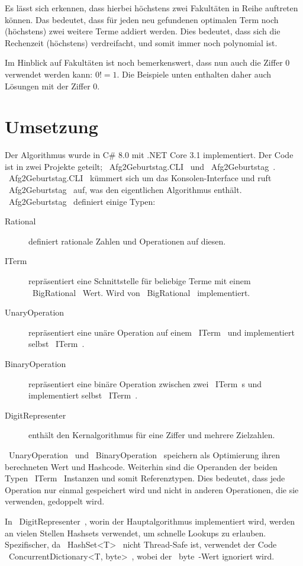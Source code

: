 \documentclass{article}
\theoremstyle{nonumberplain}
\begin{document}
Es lässt sich erkennen, dass hierbei höchstens zwei Fakultäten in Reihe auftreten können.
Das bedeutet, dass für jeden neu gefundenen optimalen Term noch (höchstens) zwei weitere Terme addiert werden.
Dies bedeutet, dass sich die Rechenzeit (höchstens) verdreifacht, und somit immer noch polynomial ist.

Im Hinblick auf Fakultäten ist noch bemerkenswert, dass nun auch die Ziffer \(0\) verwendet werden kann:
\(0! = 1\).
Die Beispiele unten enthalten daher auch Lösungen mit der Ziffer \(0\).

\section{Umsetzung}

Der Algorithmus wurde in C\# 8.0 mit .NET Core 3.1 implementiert.
Der Code ist in zwei Projekte geteilt;
~Afg2Geburtstag.CLI~ und ~Afg2Geburtstag~.
~Afg2Geburtstag.CLI~ kümmert sich um das Konsolen-Interface und ruft ~Afg2Geburtstag~ auf, was den eigentlichen Algorithmus enthält.
~Afg2Geburtstag~ definiert einige Typen:

\begin{description}
    \item[Rational] definiert rationale Zahlen und Operationen auf diesen.
    \item[ITerm] repräsentiert eine Schnittstelle für beliebige Terme mit einem ~BigRational~ Wert. Wird von ~BigRational~ implementiert.
    \item[UnaryOperation] repräsentiert eine unäre Operation auf einem ~ITerm~ und implementiert selbst ~ITerm~.
    \item[BinaryOperation] repräsentiert eine binäre Operation zwischen zwei ~ITerm~s und implementiert selbst ~ITerm~.
    \item[DigitRepresenter] enthält den Kernalgorithmus für eine Ziffer und mehrere Zielzahlen.
\end{description}

~UnaryOperation~ und ~BinaryOperation~ speichern als Optimierung ihren berechneten Wert und Hashcode.
Weiterhin sind die Operanden der beiden Typen ~ITerm~ Instanzen und somit Referenztypen.
Dies bedeutet, dass jede Operation nur einmal gespeichert wird und nicht in anderen Operationen, die sie verwenden, gedoppelt wird.

In ~DigitRepresenter~, worin der Hauptalgorithmus implementiert wird, werden an vielen Stellen Hashsets verwendet, um schnelle Lookups zu erlauben.
Spezifischer, da ~HashSet<T>~ nicht Thread-Safe ist, verwendet der Code ~ConcurrentDictionary<T, byte>~, wobei der ~byte~-Wert ignoriert wird.
\end{document}
